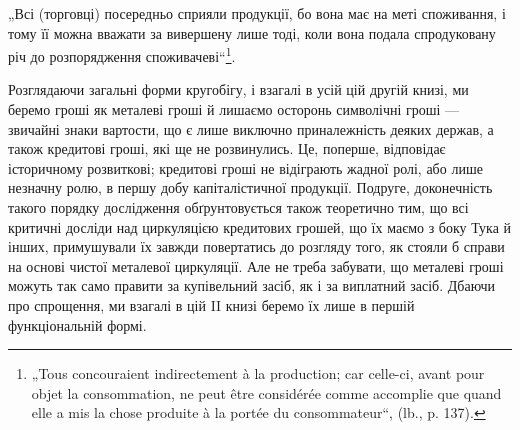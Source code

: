 „Всі (торговці) посередньо сприяли продукції, бо вона має на меті
споживання, і тому її можна вважати за вивершену лише тоді, коли
вона подала спродуковану річ до розпорядження споживачеві“\footnote*{
„Tous concouraient indirectement à la production; car celle-ci, avant pour
objet la consommation, ne peut être considérée comme accomplie que quand elle a
mis la chose produite à la portée du consommateur“, (lb., p. 137).
}.

Розглядаючи загальні форми кругобігу, і взагалі в усій цій другій
книзі, ми беремо гроші як металеві гроші й лишаємо осторонь
символічні гроші — звичайні знаки вартости, що є лише виключно приналежність
деяких держав, а також кредитові гроші, які ще не розвинулись.
Це, поперше, відповідає історичному розвиткові; кредитові гроші
не відіграють жадної ролі, або лише незначну ролю, в першу добу капіталістичної
продукції. Подруге, доконечність такого порядку дослідження
обґрунтовується також теоретично тим, що всі критичні досліди над
циркуляцією кредитових грошей, що їх маємо з боку Тука й інших,
примушували їх завжди повертатись до розгляду того, як стояли б справи
на основі чистої металевої циркуляції. Але не треба забувати, що металеві
гроші можуть так само правити за купівельний засіб, як і за виплатний
засіб. Дбаючи про спрощення, ми взагалі в цій II книзі беремо їх лише
в першій функціональній формі.
